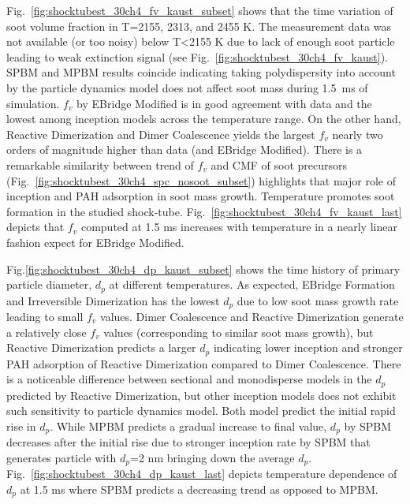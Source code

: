 Fig.~\ref{fig:shocktubest_30ch4_fv_kaust_subset} shows that the time variation of soot volume fraction in T=2155, 2313, and 2455 K. The measurement data was not available (or too noisy) below T<2155 K due to lack of enough soot particle leading to weak extinction signal (see Fig.~\ref{fig:shocktubest_30ch4_fv_kaust}). SPBM and MPBM results coincide indicating taking polydispersity into account by the particle dynamics model does not affect soot mass during 1.5~ms of simulation. $f_v$ by EBridge Modified is in good agreement with data and the lowest among inception models across the temperature range. On the other hand, Reactive Dimerization and Dimer Coalescence yields the largest $f_v$ nearly two orders of magnitude higher than data (and EBridge Modified). There is a remarkable similarity between trend of $f_v$ and CMF of soot precursors (Fig.~\ref{fig:shocktubest_30ch4_spc_nosoot_subset}) highlights that major role of inception and PAH adsorption in soot mass growth. Temperature promotes soot formation in the studied shock-tube. Fig.~\ref{fig:shocktubest_30ch4_fv_kaust_last} depicts that $f_v$ computed at 1.5 ms increases with temperature in a nearly linear fashion expect for EBridge Modified.

Fig.\ref{fig:shocktubest_30ch4_dp_kaust_subset} shows the time history of primary particle diameter, $d_p$ at different temperatures. As expected, EBridge Formation and Irreversible Dimerization has the lowest $d_p$ due to low soot mass growth rate leading to small $f_v$ values. Dimer Coalescence and Reactive Dimerization generate a relatively close $f_v$ values (corresponding to similar soot mass growth), but Reactive Dimerization predicts a larger $d_p$ indicating lower inception and stronger PAH adsorption of Reactive Dimerization compared to Dimer Coalescence. There is a noticeable difference between sectional and monodisperse models in the $d_p$ predicted by Reactive Dimerization, but other inception models does not exhibit such sensitivity to particle dynamics model. Both model predict the initial rapid rise in $d_p$. While MPBM predicts a gradual increase to final value, $d_p$ by SPBM decreases after the initial rise due to stronger inception rate by SPBM that generates particle with $d_p$=2 nm bringing down the average $d_p$. Fig.~\ref{fig:shocktubest_30ch4_dp_kaust_last} depicts temperature dependence of $d_p$ at 1.5 ms where SPBM predicts a decreasing trend as opposed to MPBM.



